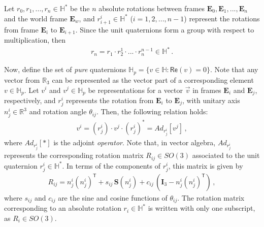 Let $r_0, r_1, ... , r_n \in \mathbb{H}^*$ be the $n$ absolute rotations between frames $\mathbf{E}_0, \mathbf{E}_1, ..., \mathbf{E}_n$ and the world frame $\mathbf{E}_w$, and $r^i_{i+1} \in \mathbb{H}^*$ ($i=1,2,...,n-1$) represent the rotations from frame $\mathbf{E}_i$ to $\mathbf{E}_{i+1}$.
Since the unit quaternions form a group with respect to multiplication, then
%
\begin{align}
r_n = r_1 \cdot r^1_2 \cdot ... \cdot r^{n-1}_n \in \mathbb{H}^* \,.
\end{align}

Now, define the set of \textit{pure} quaternions $\mathbb{H}_p = \{ v \in \mathbb{H}: \mathsf{Re}(v) = 0 \}$.
%
Note that any vector from $\mathbb{R}_3$ can be represented as the vector part of a corresponding element $v \in \mathbb{H}_p$.
%
%
Let $v^i$ and $v^j \!\in\! \mathbb{H}_p$ be representations for a vector $\vec{v}$ in frames $\mathbf{E}_i$ and $\mathbf{E}_j$, respectively, and $r^i_j$ represents the rotation from $\mathbf{E}_i$ to $\mathbf{E}_j$, with unitary axis $n^i_{j} \in \mathbb{R}^3$ and rotation angle $\theta_{ij}$.
%
Then, the following relation holds:
%
\begin{align}
v^i = (r^i_j) \cdot v^j \cdot (r^i_j)^* = Ad_{r^i_j} \left[ v^j \right] \,,
\end{align}
%
where $Ad_{r^i_j}[*]$ is the adjoint {\it operator}.
%
Note that, in vector algebra, $Ad_{r^i_j}$ represents the corresponding rotation matrix $R_{ij} \in SO(3)$ associated to the unit quaternion $r^i_j \in \mathbb{H}^*$.
%
In terms of the components of $r^i_j$, this matrix is given by
%
\begin{align}
R_{ij} = n^i_{j} (n^i_{j})^\mathsf{T} + s_{ij} \, \mathbf{S}(n^i_{j}) + c_{ij} \, (\mathbf{I}_3 - n^i_{j} (n^i_{j})^\mathsf{T}) \,,
\label{eq:quaternion_rotation_matrix}
\end{align}
%
where $s_{ij}$ and $c_{ij}$ are the sine and cosine functions of $\theta_{ij}$.
The rotation matrix corresponding to an absolute rotation $r_i \in \mathbb{H}^*$ is written with only one subscript, as $R_i \in SO(3)$.

